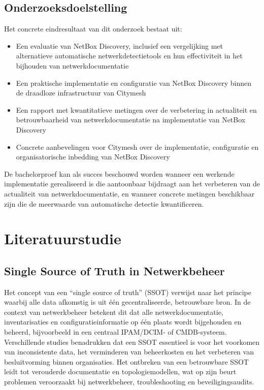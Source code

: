 \subsection{Onderzoeksdoelstelling}

Het concrete eindresultaat van dit onderzoek bestaat uit:
\begin{itemize}
  \item Een evaluatie van NetBox Discovery, inclusief een vergelijking met alternatieve automatische netwerkdetectietools en hun effectiviteit in het bijhouden van netwerkdocumentatie
  \item Een praktische implementatie en configuratie van NetBox Discovery binnen de draadloze infrastructuur van Citymesh
  \item Een rapport met kwantitatieve metingen over de verbetering in actualiteit en betrouwbaarheid van netwerkdocumentatie na implementatie van NetBox Discovery
  \item Concrete aanbevelingen voor Citymesh over de implementatie, configuratie en organisatorische inbedding van NetBox Discovery
\end{itemize}

De bachelorproef kan als succes beschouwd worden wanneer een werkende implementatie gerealiseerd is die aantoonbaar bijdraagt aan het verbeteren van de actualiteit van netwerkdocumentatie, en wanneer concrete metingen beschikbaar zijn die de meerwaarde van automatische detectie kwantificeren.


\section{Literatuurstudie}%
\label{sec:literatuurstudie}

\subsection{Single Source of Truth in Netwerkbeheer}

Het concept van een ``single source of truth'' (SSOT) verwijst naar het principe waarbij alle data afkomstig is uit één gecentraliseerde, betrouwbare bron.\autocite{Campbell2007} In de context van netwerkbeheer betekent dit dat alle netwerkdocumentatie, inventarisaties en configuratieinformatie op één plaats wordt bijgehouden en beheerd, bijvoorbeeld in een centraal IPAM/DCIM- of CMDB-systeem.\autocite{Campbell2007} Verschillende studies benadrukken dat een SSOT essentieel is voor het voorkomen van inconsistente data, het verminderen van beheerkosten en het verbeteren van besluitvorming binnen organisaties.\autocite{Campbell2007} Het ontbreken van een betrouwbare SSOT leidt tot verouderde documentatie en topologiemodellen, wat op zijn beurt problemen veroorzaakt bij netwerkbeheer, troubleshooting en beveiligingsaudits.\autocite{Campbell2007}

